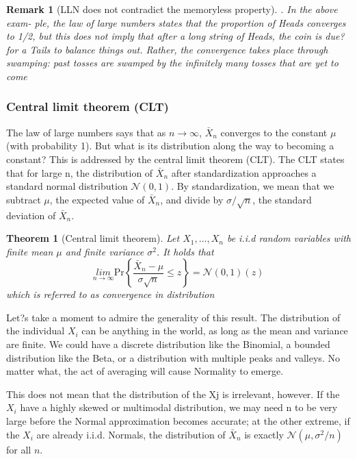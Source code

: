 \documentclass[12pt,a4paper]{article}
\newtheorem{theorem}{Theorem}
\newtheorem{remark}{Remark}
\newcommand{\calN}{\mathcal N}
\begin{document}
\begin{remark}
	[LLN does not contradict the memoryless property]. In the above exam-
	ple, the law of large numbers states that the proportion of Heads converges to 1/2,
	but this does not imply that after a long string of Heads, the coin is due? for a Tails
	to balance things out. Rather, the convergence takes place through swamping: past
	tosses are swamped by the infinitely many tosses that are yet to come
\end{remark}

\subsubsection{Central limit theorem (CLT)}
The law of large numbers says that as $n\rightarrow\infty$, $\bar X_n$ converges to the constant $\mu$ (with probability 1). But what is its distribution along the way to becoming a constant? This is addressed by the central limit theorem (CLT).
The CLT states that for large n, the distribution of $\bar X_n$ after standardization approaches a standard normal distribution $\calN(0,1)$. 
By standardization, we mean that we subtract $\mu$, the expected value of $\bar X_n$, and divide by $\sigma/\sqrt{n}$, the standard deviation of $\bar X_n$.


\begin{theorem}[Central limit theorem]
	Let $X_1,\ldots, X_n$ be i.i.d random variables with finite mean $\mu$ and finite variance $\sigma^2$. It holds that
	\begin{equation}
		\underset{n\rightarrow\infty}{lim}\text{Pr}\left\{\frac{\bar X_n-\mu}{\sigma\sqrt{n}}\leq z\right\} = \calN(0,1)(z)
	\end{equation}
	which is referred to as convergence in distribution
\end{theorem}
Let?s take a moment to admire the generality of this result. 
The distribution of the individual $X_i$ can be anything in the world, as long as the mean and variance are finite. 
We could have a discrete distribution like the Binomial, a bounded distribution like the Beta, or a distribution with multiple peaks and valleys. 
No matter what, the act of averaging will cause Normality to emerge. 
	
This does not mean that the distribution of the Xj is irrelevant, however. 
If the $X_i$ have a highly skewed or multimodal distribution, we may need n to be very large before the Normal approximation becomes accurate; at the other extreme, if the $X_i$ are already i.i.d. Normals, the distribution of $\bar X_n$ is exactly $\calN (\mu, \sigma^2/n)$ for all $n$. 
\end{document}
